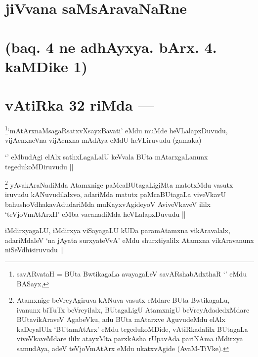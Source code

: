 
\section*{jiVvana saMsAravaNaRne}

\section*{(baq. 4 ne adhAyxya. bArx. 4. kaMDike 1)}

\section*{vAtiRka 32 riMda ---}


\begin{artha}
\footnote{savARvataH = BUta BwtikagaLa avayagaLeV savARshabAdxthaR
  `\stext' eMdu BASayx,}`mAtArx\s naMsagaRsatxvXsayxBavati' eMdu muMde
heVLalapxDuvudu, vijAcnxneVna vijAcnxna mAdAya eMdU heVLiruvudu
(gamaka)
\end{artha}

\begin{artha}
`\stext' eMbudAgi elAlx sathxLagaLalU keVvala BUta mAtarxgaLanunx
  tegedukoMDiruvudu ||
\end{artha}

\begin{artha}
\footnote{Atamxnige beVreyAgiruva kANuva vasutx eMdare BUta
  BwtikagaLu, ivanunx biTuTx beVreyilalx, BUtagaLigU AtamxnigU
  beVreyAdadedxMdare BUtavikAraveV AgabeVku, adu BUta mAtarxve
  AguvudeMdu elAlx kaDeyalUlx `BUtamAtArx' eMdu tegedukoMDide,
  vAtiRkadalilx BUtagaLa viveVkaveMdare ililx atayxMta parxkAsha
  rUpavAda pariNAma iMdirxya samudAya, adeV teVjoVmAtArx eMdu
  ukatxvAgide (AvaM-TiVke).}
yAvakAraNadiMda Atamxnige paMcaBUtagaLigiMta matotxMdu vasutx iruvudu
kANuvudilalxvo, adariMda matutx paMcaBUtagaLa viveVkavU
bahushoVdhakavAdudariMda muKayxvAgideyoV AviveVkaveV ililx
`teVjoVmAtArxH' eMba vacanadiMda heVLalapxDuvudu ||
\end{artha}


\begin{artha}
iMdirxyagaLU, iMdirxya viSayagaLU kUDa paramAtamxna vikAravalalx,
adariMdaleV `na jAyata surxyateVvA' eMdu shurxtiyalilx Atamxna
vikAravanunx niSeVdhisiruvudu ||
\end{artha}

